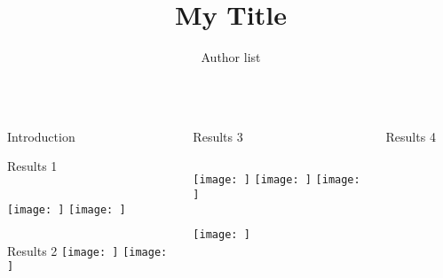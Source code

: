 \documentclass[final]{beamer}
\title{My Title}
\author{Author list}
\institute{My institute}
\begin{document}
\begin{frame}{}
  \begin{columns}[t]

    \begin{column}{0.32\linewidth}

      \begin{block}{Introduction}
      \end{block}

	  \begin{block}{Results 1}
		\begin{columns}[T]
		\texttt{[image: ]}
		\texttt{[image: ]}
		\end{columns}
	  \end{block}
	  
      \begin{block}{Results 2}
			\texttt{[image: ]}
			\texttt{[image: ]}
	  \end{block}

    \end{column}%

    \begin{column}{0.32\linewidth}

      \begin{block}{Results 3}
	  \begin{columns}[T]
			\texttt{[image: ]}
			\texttt{[image: ]}
			\texttt{[image: ]}
	  \end{columns}
	  \texttt{[image: ]}
      \end{block}

    \end{column}%

    \begin{column}{0.32\linewidth}

	  \begin{block}{Results 4}
	  	\begin{figure}
		\end{figure}
      \end{block}


\end{column}
\end{columns}
\end{frame}
\end{document}
